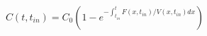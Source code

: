 \begin{equation}
C(t,t_{in}) = C_0\left(1-e^{-\int_{t_{in}}^t F(x,t_{in})/V(x,t_{in}) dx} \right)
\end{equation}